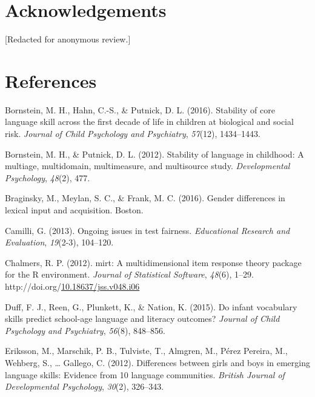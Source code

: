 \documentclass[10pt, letterpaper]{article}
\newenvironment{CSLReferences}%
  {}%
  {\par}
\begin{document}
\hypertarget{acknowledgements}{%
\section{Acknowledgements}\label{acknowledgements}}

{[}Redacted for anonymous review.{]}

\hypertarget{references}{%
\section{References}\label{references}}

\setlength{\parindent}{-0.1in} 
\setlength{\leftskip}{0.125in}

\noindent

\hypertarget{refs}{}
\begin{CSLReferences}{1}{0}
\leavevmode\hypertarget{ref-bornstein2016stability}{}%
Bornstein, M. H., Hahn, C.-S., \& Putnick, D. L. (2016). Stability of
core language skill across the first decade of life in children at
biological and social risk. \emph{Journal of Child Psychology and
Psychiatry}, \emph{57}(12), 1434--1443.

\leavevmode\hypertarget{ref-bornstein2012stability}{}%
Bornstein, M. H., \& Putnick, D. L. (2012). Stability of language in
childhood: A multiage, multidomain, multimeasure, and multisource study.
\emph{Developmental Psychology}, \emph{48}(2), 477.

\leavevmode\hypertarget{ref-braginsky2016gender}{}%
Braginsky, M., Meylan, S. C., \& Frank, M. C. (2016). Gender differences
in lexical input and acquisition. Boston.

\leavevmode\hypertarget{ref-camilli2013ongoing}{}%
Camilli, G. (2013). Ongoing issues in test fairness. \emph{Educational
Research and Evaluation}, \emph{19}(2-3), 104--120.

\leavevmode\hypertarget{ref-R-mirt}{}%
Chalmers, R. P. (2012). {mirt}: A multidimensional item response theory
package for the {R} environment. \emph{Journal of Statistical Software},
\emph{48}(6), 1--29.
http://doi.org/\href{https://doi.org/10.18637/jss.v048.i06}{10.18637/jss.v048.i06}

\leavevmode\hypertarget{ref-duff2015infant}{}%
Duff, F. J., Reen, G., Plunkett, K., \& Nation, K. (2015). Do infant
vocabulary skills predict school-age language and literacy outcomes?
\emph{Journal of Child Psychology and Psychiatry}, \emph{56}(8),
848--856.

\leavevmode\hypertarget{ref-eriksson2012differences}{}%
Eriksson, M., Marschik, P. B., Tulviste, T., Almgren, M., Pérez Pereira,
M., Wehberg, S., \ldots{} Gallego, C. (2012). Differences between girls
and boys in emerging language skills: Evidence from 10 language
communities. \emph{British Journal of Developmental Psychology},
\emph{30}(2), 326--343.


\end{CSLReferences}
\end{document}
